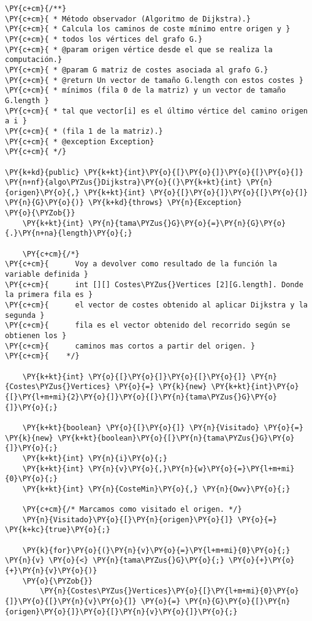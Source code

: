 \begin{Verbatim}[commandchars=\\\{\}]
\PY{c+cm}{/**}
\PY{c+cm}{ * Método observador (Algoritmo de Dijkstra).}
\PY{c+cm}{ * Calcula los caminos de coste mínimo entre origen y }
\PY{c+cm}{ * todos los vértices del grafo G.}
\PY{c+cm}{ * @param origen vértice desde el que se realiza la computación.}
\PY{c+cm}{ * @param G matriz de costes asociada al grafo G.}
\PY{c+cm}{ * @return Un vector de tamaño G.length con estos costes }
\PY{c+cm}{ * mínimos (fila 0 de la matriz) y un vector de tamaño G.length }
\PY{c+cm}{ * tal que vector[i] es el último vértice del camino origen a i }
\PY{c+cm}{ * (fila 1 de la matriz).}
\PY{c+cm}{ * @exception Exception}
\PY{c+cm}{ */}

\PY{k+kd}{public} \PY{k+kt}{int}\PY{o}{[}\PY{o}{]}\PY{o}{[}\PY{o}{]} \PY{n+nf}{algo\PYZus{}Dijkstra}\PY{o}{(}\PY{k+kt}{int} \PY{n}{origen}\PY{o}{,} \PY{k+kt}{int} \PY{o}{[}\PY{o}{]}\PY{o}{[}\PY{o}{]} \PY{n}{G}\PY{o}{)} \PY{k+kd}{throws} \PY{n}{Exception}
\PY{o}{\PYZob{}}
    \PY{k+kt}{int} \PY{n}{tama\PYZus{}G}\PY{o}{=}\PY{n}{G}\PY{o}{.}\PY{n+na}{length}\PY{o}{;}

    \PY{c+cm}{/*}
\PY{c+cm}{      Voy a devolver como resultado de la función la variable definida }
\PY{c+cm}{      int [][] Costes\PYZus{}Vertices [2][G.length]. Donde la primera fila es }
\PY{c+cm}{      el vector de costes obtenido al aplicar Dijkstra y la segunda }
\PY{c+cm}{      fila es el vector obtenido del recorrido según se obtienen los }
\PY{c+cm}{      caminos mas cortos a partir del origen. }
\PY{c+cm}{    */}

    \PY{k+kt}{int} \PY{o}{[}\PY{o}{]}\PY{o}{[}\PY{o}{]} \PY{n}{Costes\PYZus{}Vertices} \PY{o}{=} \PY{k}{new} \PY{k+kt}{int}\PY{o}{[}\PY{l+m+mi}{2}\PY{o}{]}\PY{o}{[}\PY{n}{tama\PYZus{}G}\PY{o}{]}\PY{o}{;}

    \PY{k+kt}{boolean} \PY{o}{[}\PY{o}{]} \PY{n}{Visitado} \PY{o}{=} \PY{k}{new} \PY{k+kt}{boolean}\PY{o}{[}\PY{n}{tama\PYZus{}G}\PY{o}{]}\PY{o}{;}
    \PY{k+kt}{int} \PY{n}{i}\PY{o}{;}
    \PY{k+kt}{int} \PY{n}{v}\PY{o}{,}\PY{n}{w}\PY{o}{=}\PY{l+m+mi}{0}\PY{o}{;}
    \PY{k+kt}{int} \PY{n}{CosteMin}\PY{o}{,} \PY{n}{Owv}\PY{o}{;}
	
    \PY{c+cm}{/* Marcamos como visitado el origen. */}
    \PY{n}{Visitado}\PY{o}{[}\PY{n}{origen}\PY{o}{]} \PY{o}{=} \PY{k+kc}{true}\PY{o}{;}

    \PY{k}{for}\PY{o}{(}\PY{n}{v}\PY{o}{=}\PY{l+m+mi}{0}\PY{o}{;} \PY{n}{v} \PY{o}{<} \PY{n}{tama\PYZus{}G}\PY{o}{;} \PY{o}{+}\PY{o}{+}\PY{n}{v}\PY{o}{)}
	\PY{o}{\PYZob{}}
	    \PY{n}{Costes\PYZus{}Vertices}\PY{o}{[}\PY{l+m+mi}{0}\PY{o}{]}\PY{o}{[}\PY{n}{v}\PY{o}{]} \PY{o}{=} \PY{n}{G}\PY{o}{[}\PY{n}{origen}\PY{o}{]}\PY{o}{[}\PY{n}{v}\PY{o}{]}\PY{o}{;}


\end{Verbatim}
